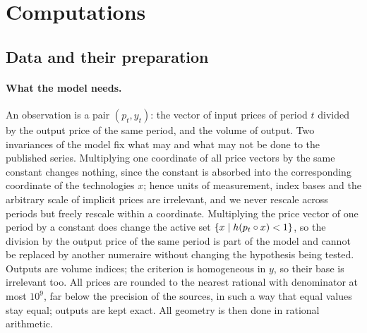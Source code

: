\section{Computations}\label{sec:comp}

\subsection{Data and their preparation}
\paragraph{What the model needs.} An observation is a pair $(p_t,y_t)$: the vector of input prices of period $t$ divided by the output price of the same period, and the volume of output. Two invariances of the model fix what may and what may not be done to the published series. Multiplying one coordinate of all price vectors by the same constant changes nothing, since the constant is absorbed into the corresponding coordinate of the technologies $x$; hence units of measurement, index bases and the arbitrary scale of implicit prices are irrelevant, and we never rescale across periods but freely rescale within a coordinate. Multiplying the price vector of one period by a constant does change the active set $\left\{ x\mid h(p_t\circ x)<1 \right\}$, so the division by the output price of the same period is part of the model and cannot be replaced by another numeraire without changing the hypothesis being tested. Outputs are volume indices; the criterion is homogeneous in $y$, so their base is irrelevant too. All prices are rounded to the nearest rational with denominator at most $10^9$, far below the precision of the sources, in such a way that equal values stay equal; outputs are kept exact. All geometry is then done in rational arithmetic.

